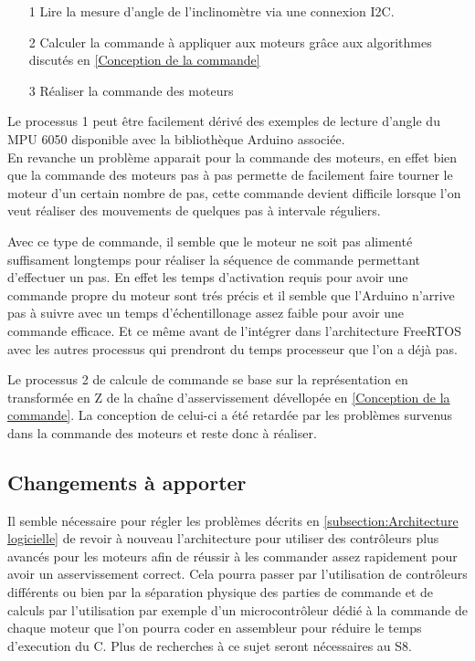 \documentclass[oneside,a4paper,12pt]{article}
\begin{document}
	\begin{itemize}
		\item[1] Lire la mesure d'angle de l'inclinomètre via une connexion I2C.
		\item[2] Calculer la commande à appliquer aux moteurs grâce aux algorithmes discutés en \ref{Conception de la commande}
		\item[3] Réaliser la commande des moteurs
	\end{itemize}
	
	Le processus 1 peut être facilement dérivé des exemples de lecture d'angle du MPU 6050 disponible avec la bibliothèque Arduino associée.\\
	En revanche un problème apparait pour la commande des moteurs, en effet bien que la commande des moteurs pas à pas permette de facilement faire tourner le moteur d'un certain nombre de pas, cette commande devient difficile lorsque l'on veut réaliser des mouvements de quelques pas à intervale réguliers.
	
	Avec ce type de commande, il semble que le moteur ne soit pas alimenté suffisament longtemps pour réaliser la séquence de commande permettant d'effectuer un pas. En effet les temps d'activation requis pour avoir une commande propre du moteur sont trés précis et il semble que l'Arduino n'arrive pas à suivre avec un temps d'échentillonage assez faible pour avoir une commande efficace. Et ce même avant de l'intégrer dans l'architecture FreeRTOS avec les autres processus qui prendront du temps processeur que l'on a déjà pas.
	
	Le processus 2 de calcule de commande se base sur la représentation en transformée en Z de la chaîne d'asservissement dévellopée en \ref{Conception de la commande}. La conception de celui-ci a été retardée par les problèmes survenus dans la commande des moteurs et reste donc à réaliser.
	
	\subsection{Changements à apporter}
	
	Il semble nécessaire pour régler les problèmes décrits en \ref{subsection:Architecture logicielle} de revoir à nouveau l'architecture pour utiliser des contrôleurs plus avancés pour les moteurs afin de réussir à les commander assez rapidement pour avoir un asservissement correct. Cela pourra passer par l'utilisation de contrôleurs différents ou bien par la séparation physique des parties de commande et de calculs par l'utilisation par exemple d'un microcontrôleur dédié à la commande de chaque moteur que l'on pourra coder en assembleur pour réduire le temps d'execution du C. Plus de recherches à ce sujet seront nécessaires au S8.
	
\end{document}

